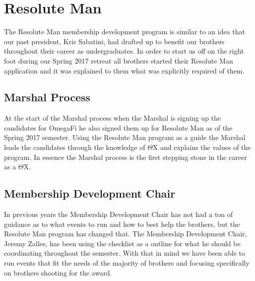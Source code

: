 \chapter{Resolute Man}

	The Resolute Man membership development program is similar to an idea that our past president, Kris Sabatini, had drafted up to benefit our brothers throughout their career as undergraduates. In order to start us off on the right foot during our Spring 2017 retreat all brothers started their Resolute Man application and it was explained to them what was explicitly required of them.
	
	\section*{Marshal Process}
	
	At the start of the Marshal process when the Marshal is signing up the candidates for OmegaFi he also signed them up for Resolute Man as of the Spring 2017 semester. Using the Resolute Man program as a guide the Marshal leads the candidates through the knowledge of $\Theta$X and explains the values of the program. In essence the Marshal process is the first stepping stone in the career as a $\Theta$X.
	
	\section*{Membership Development Chair}  
    
    In previous years the Membership Development Chair has not had a ton of guidance as to what events to run and how to best help the brothers, but the Resolute Man program has changed that. The Membership Development Chair, Jeremy Zalles, has been using the checklist as a outline for what he should be coordinating throughout the semester. With that in mind we have been able to run events that fit the needs of the majority of brothers and focusing specifically on brothers shooting for the award.